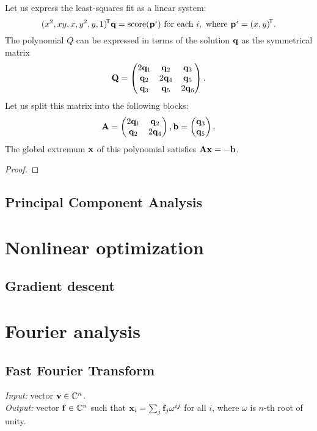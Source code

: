 Let us express the least-squares fit as a linear system:
$$(x^2, xy, x, y^2, y, 1)^{\!\mathsf{T}} \mathbf{q} = \textrm{score}(\mathbf{p}^i) \text{ for each } i, \text{ where } \mathbf{p}^i = (x, y)^{\!\mathsf{T}}.$$
The polynomial $Q$ can be expressed in terms of the solution $\mathbf{q}$ as the symmetrical matrix
$$\mathbf{Q} = \begin{pmatrix}
 2 \mathbf{q}_1 & \mathbf{q}_2 & \mathbf{q}_3 \\
 \mathbf{q}_2 & 2 \mathbf{q}_4 & \mathbf{q}_5 \\
 \mathbf{q}_3 & \mathbf{q}_5 & 2 \mathbf{q}_6
\end{pmatrix}.$$
Let us split this matrix into the following blocks:
$$\mathbf{A} = \begin{pmatrix}
 2 \mathbf{q}_1 & \mathbf{q}_2 \\
 \mathbf{q}_2 & 2 \mathbf{q}_4 \\
\end{pmatrix},
\mathbf{b} = \begin{pmatrix}
 \mathbf{q}_3 \\
 \mathbf{q}_5 \\
\end{pmatrix}.$$
The global extremum $\mathbf{x}$ of this polynomial satisfies $\mathbf{A} \mathbf{x} = -\mathbf{b}$.

\begin{proof}
\todo{\dots}
\end{proof}

\subsection{Principal Component Analysis}

\section{Nonlinear optimization}

\subsection{Gradient descent}


\section{Fourier analysis}

\subsection{Fast Fourier Transform}
\textit{Input:} vector $\mathbf{v} \in \mathbb{C}^n$.\\
\textit{Output:} vector $\mathbf{f} \in \mathbb{C}^n$ such that $\mathbf{x}_i = \sum_j \mathbf{f}_j \omega^{i j}$ for all $i$, where $\omega$ is $n$-th root of unity.\\

